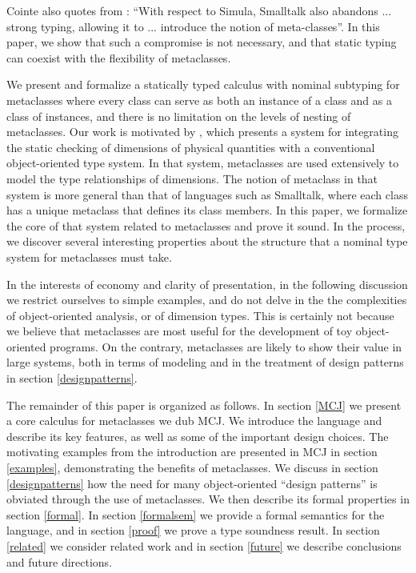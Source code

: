 \documentclass{acmconfbig}
\begin{document}
Cointe also quotes from \cite{cardelli:multiple}: ``With respect to
Simula, Smalltalk also abandons ... strong typing, allowing it to
... introduce the notion of meta-classes''.  In this paper, we show
that such a compromise is not necessary, and that static typing can
coexist with the flexibility of metaclasses.

We present and formalize a statically typed calculus with nominal
subtyping for metaclasses where every class can serve as both an
instance of a class and as a class of instances, and there is no
limitation on the levels of nesting of metaclasses. Our work is
motivated by \cite{DimUnits}, which presents a system for integrating
the static checking of dimensions of physical quantities with a
conventional object-oriented type system. In that system, metaclasses
are used extensively to model the type relationships of dimensions.
The notion of metaclass in that system is more general than that of
languages such as Smalltalk, where each class has a unique metaclass
that defines its class members. In this paper, we formalize the core
of that system related to metaclasses and prove it sound.  In the
process, we discover several interesting properties about the
structure that a nominal type system for metaclasses must take.

In the interests of economy and clarity of presentation, in the
following discussion we restrict ourselves to simple examples, and do
not delve in the the complexities of object-oriented analysis, or of
dimension types.  This is certainly not because we believe that
metaclasses are most useful for the development of toy object-oriented
programs.  On the contrary, metaclasses are likely to show their value
in large systems, both in terms of modeling and in the treatment of
design patterns in section \ref{designpatterns}.

The remainder of this paper is organized as follows.  In section
\ref{MCJ} we present a core calculus for metaclasses we dub MCJ.
We introduce the language and describe its key features, as
well as some of the important design choices.  The motivating examples
from the introduction are presented in MCJ in section \ref{examples},
demonstrating the benefits of metaclasses. We discuss in section
\ref{designpatterns} how the need for many object-oriented ``design
patterns'' is obviated through the use of metaclasses. We then
describe its formal properties in section \ref{formal}.  In section
\ref{formalsem} we provide a formal semantics for the language, and in
section \ref{proof} we prove a type soundness result.  In section
\ref{related} we consider related work and in section \ref{future} we
describe conclusions and future directions.
\end{document}
